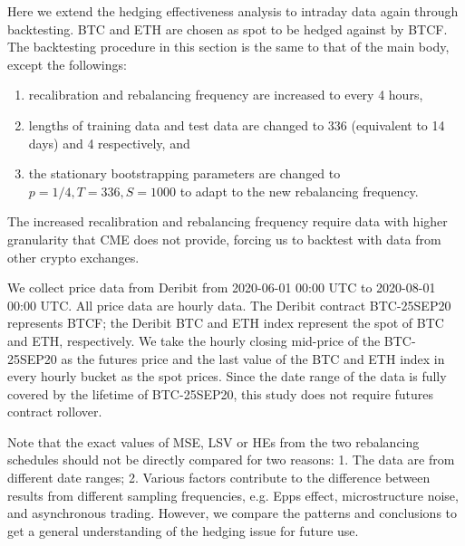 \documentclass[11pt,a4paper,english]{article}
\providecommand{\natp}[1]{\textcolor{darkorange}{#1}}
\begin{document}

Here we extend the hedging effectiveness analysis to intraday data again through backtesting.
BTC and ETH are chosen as spot to be hedged against by BTCF. 
The backtesting procedure in this section is the same to that of the main body, except the followings:
\begin{enumerate}
  \item recalibration and rebalancing frequency are increased to every 4 hours,
  \item lengths of training data and test data are changed to 336 (equivalent to 14 days) and 4 respectively, and
  \item the stationary bootstrapping parameters are changed to $p=1/4, T=336, S=1000$ to adapt to the new rebalancing frequency. 
\end{enumerate}

The increased recalibration and rebalancing frequency require data with higher granularity that CME does not provide, 
forcing us to backtest with data from other crypto exchanges.

We collect price data from Deribit from 2020-06-01 00:00 UTC to 2020-08-01 00:00 UTC. 
All price data are hourly data.
The Deribit contract BTC-25SEP20 represents BTCF;
the Deribit BTC and ETH index represent the spot of BTC and ETH, respectively.
We take the hourly closing mid-price of the BTC-25SEP20 as the futures price and the last value of the BTC and ETH index in every hourly bucket as the spot prices.
Since the date range of the data is fully covered by the lifetime of BTC-25SEP20, this study does not require futures contract rollover.

Note that the exact values of MSE, LSV or HEs from the two rebalancing schedules should not be directly compared for two reasons: 1. The data are from different date ranges; 2. Various factors contribute to the difference between results from different sampling frequencies, e.g. Epps effect, microstructure noise,
and asynchronous trading.
However, we compare the patterns and conclusions to get a general understanding of the hedging issue for future use.

\end{document}
